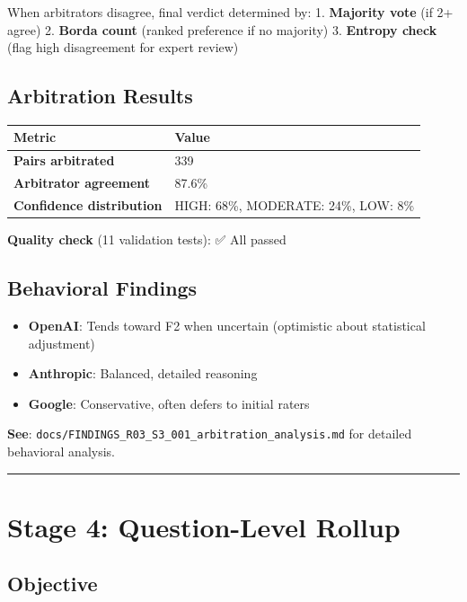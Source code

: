 \documentclass[
  letterpaper,
]{report}
\providecommand{\tightlist}{%
  \setlength{\itemsep}{0pt}\setlength{\parskip}{0pt}}
\begin{document}
When arbitrators disagree, final verdict determined by: 1.
\textbf{Majority vote} (if 2+ agree) 2. \textbf{Borda count} (ranked
preference if no majority) 3. \textbf{Entropy check} (flag high
disagreement for expert review)

\subsection{Arbitration Results}\label{arbitration-results}

\begin{longtable}[]{@{}ll@{}}
\toprule\noalign{}
Metric & Value \\
\midrule\noalign{}
\endhead
\bottomrule\noalign{}
\endlastfoot
\textbf{Pairs arbitrated} & 339 \\
\textbf{Arbitrator agreement} & 87.6\% \\
\textbf{Confidence distribution} & HIGH: 68\%, MODERATE: 24\%, LOW:
8\% \\
\end{longtable}

\textbf{Quality check} (11 validation tests): ✅ All passed

\subsection{Behavioral Findings}\label{behavioral-findings}

\begin{itemize}
\tightlist
\item
  \textbf{OpenAI}: Tends toward F2 when uncertain (optimistic about
  statistical adjustment)
\item
  \textbf{Anthropic}: Balanced, detailed reasoning
\item
  \textbf{Google}: Conservative, often defers to initial raters
\end{itemize}

\textbf{See}:
\texttt{docs/FINDINGS\_R03\_S3\_001\_arbitration\_analysis.md} for
detailed behavioral analysis.

\begin{center}\rule{0.5\linewidth}{0.5pt}\end{center}

\section{Stage 4: Question-Level
Rollup}\label{stage-4-question-level-rollup}

\subsection{Objective}\label{objective-3}
\end{document}
